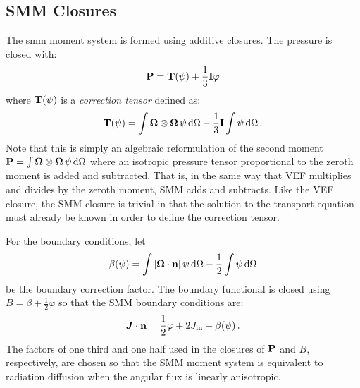 \documentclass[../doc.tex]{subfiles}
\begin{document}
\subsection{SMM Closures}
The \gls{smm} moment system is formed using additive closures. The pressure is closed with: 
	\begin{equation}
		\P = \T(\psi) + \frac{1}{3}\I \varphi 
	\end{equation}
where $\T(\psi)$ is a \emph{correction tensor} defined as: 
	\begin{equation} \label{moment:corrten}
		\T(\psi) = \int \Omegahat\otimes\Omegahat\, \psi \ud \Omega - \frac{1}{3}\I\int \psi \ud \Omega \,. 
	\end{equation}
Note that this is simply an algebraic reformulation of the second moment $\P = \int \Omegahat\otimes\Omegahat\, \psi \ud \Omega$ where an isotropic pressure tensor proportional to the zeroth moment is added and subtracted. That is, in the same way that VEF multiplies and divides by the zeroth moment, SMM adds and subtracts. 
Like the VEF closure, the SMM closure is trivial in that the solution to the transport equation must already be known in order to define the correction tensor. 

For the boundary conditions, let
	\begin{equation} \label{moment:corrfac}
		\beta(\psi) = \int |\Omegahat\cdot\n|\,\psi \ud \Omega - \frac{1}{2}\int\psi \ud \Omega 
	\end{equation}
be the boundary correction factor. The boundary functional is closed using $B = \beta + \frac{1}{2}\varphi$ so that the SMM boundary conditions are: 
	\begin{equation}
		\vec{J}\cdot\n = \frac{1}{2}\varphi + 2\Jin + \beta(\psi) \,.  
	\end{equation}
The factors of one third and one half used in the closures of $\P$ and $B$, respectively, are chosen so that the SMM moment system is equivalent to radiation diffusion when the angular flux is linearly anisotropic. 
\end{document}

